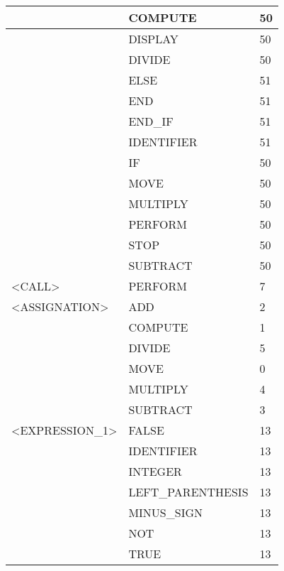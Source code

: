 \begin{longtable}{|l|l|l|}
                     &   COMPUTE              &   50 \\ \hline
                     &   DISPLAY              &   50 \\ \hline
                     &   DIVIDE               &   50 \\ \hline
                     &   ELSE                 &   51 \\ \hline
                     &   END                  &   51 \\ \hline
                     &   END\_IF               &   51 \\ \hline
                     &   IDENTIFIER           &   51 \\ \hline
                     &   IF                   &   50 \\ \hline
                     &   MOVE                 &   50 \\ \hline
                     &   MULTIPLY             &   50 \\ \hline
                     &   PERFORM              &   50 \\ \hline
                     &   STOP                 &   50 \\ \hline
                     &   SUBTRACT             &   50 \\ \hline
<CALL>               &   PERFORM              &   7 \\ \hline
<ASSIGNATION>        &   ADD                  &   2 \\ \hline
                     &   COMPUTE              &   1 \\ \hline
                     &   DIVIDE               &   5 \\ \hline
                     &   MOVE                 &   0 \\ \hline
                     &   MULTIPLY             &   4 \\ \hline
                     &   SUBTRACT             &   3 \\ \hline
<EXPRESSION\_1>       &   FALSE                &   13 \\ \hline
                     &   IDENTIFIER           &   13 \\ \hline
                     &   INTEGER              &   13 \\ \hline
                     &   LEFT\_PARENTHESIS     &   13 \\ \hline
                     &   MINUS\_SIGN           &   13 \\ \hline
                     &   NOT                  &   13 \\ \hline
                     &   TRUE                 &   13 \\ \hline

\hline

\end{longtable}